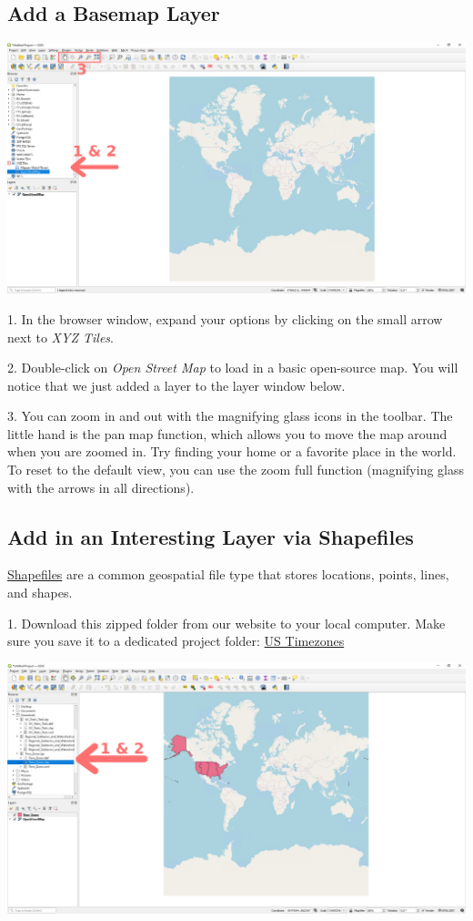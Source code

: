 \documentclass[oneside,a4paper,11pt,explicit]{book}
\begin{document}
\subsection{Add a Basemap Layer}

\centerline{\includegraphics[width=\textwidth]{QGISbasemap.png}}

1. In the browser window, expand your options by clicking on the small arrow next to \textit{XYZ Tiles}.

2. Double-click on \textit{Open Street Map} to load in a basic open-source map. You will notice that we just added a layer to the layer window below.

3. You can zoom in and out with the magnifying glass icons in the toolbar. The little hand is the pan map function, which allows you to move the map around when you are zoomed in. Try finding your home or a favorite place in the world. To reset to the default view, you can use the zoom full function (magnifying glass with the arrows in all directions).

\subsection{Add in an Interesting Layer via Shapefiles}

\href{https://en.wikipedia.org/wiki/Shapefile}{Shapefiles} are a common geospatial file type that stores locations, points, lines, and shapes.

1. Download this zipped folder from our website to your local computer. Make sure you save it to a dedicated project folder: \href{https://jeremydforsythe.github.io/icecream-tutorials/Tutorial3_MakingBasicMapsInQGIS/Time_Zones.zip}{US Timezones}

\centerline{\includegraphics[width=\textwidth]{TimeZones.png}}
\end{document}
